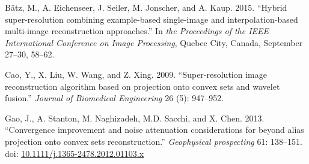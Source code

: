 \documentclass[12pt]{gsis}  %
\begin{document}
\begin{thebibliography}{}

B{\"a}tz, M., A. Eichenseer, J. Seiler, M. Jonscher, and
  A. Kaup. 2015. ``Hybrid super-resolution combining example-based
  single-image and interpolation-based multi-image reconstruction approaches.''
  In \emph{the Proceedings of the IEEE International Conference on Image
  Processing}, Quebec City, Canada, September 27–30, 58--62.

Cao, Y., X. Liu, W. Wang, and Z. Xing. 2009.
  ``Super-resolution image reconstruction algorithm based on projection onto
  convex sets and wavelet fusion.'' \emph{Journal of Biomedical Engineering} 26
  (5): 947--952.

Gao, J., A. Stanton, M. Naghizadeh, M.D. Sacchi, and
  X. Chen. 2013. ``Convergence improvement and noise attenuation
  considerations for beyond alias projection onto convex sets reconstruction.''
  \emph{Geophysical prospecting} 61: 138--151. doi: \url{10.1111/j.1365-2478.2012.01103.x}



\end{thebibliography}

%
%
\end{document}
